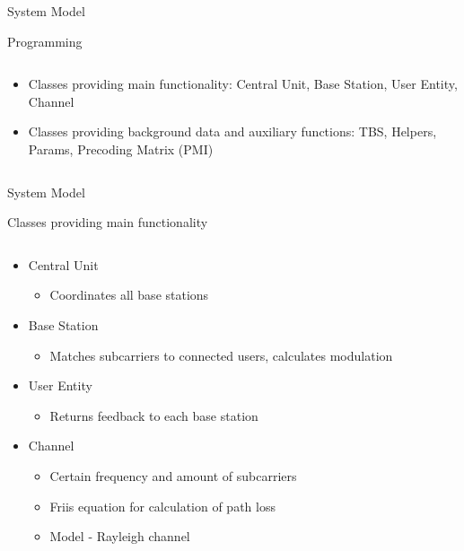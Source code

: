\documentclass[xcolor={cmyk}]{beamer}
\begin{document}
 \begin{frame}{System Model}
	 \begin{block}{Programming}
	 	\begin{columns}
			\begin{column}{.9\textwidth}
				\begin{itemize}
					\item Classes providing main functionality: Central Unit, Base Station, User Entity, Channel
					\item Classes providing background data and auxiliary functions: TBS, Helpers, Params, Precoding Matrix (PMI)
				\end{itemize}
			\end{column}
		\end{columns}
	 \end{block}
 \end{frame}
 
 
  \begin{frame}{System Model}
	 \begin{block}{Classes providing main functionality}
	 	\begin{columns}
			\begin{column}{.9\textwidth}
				\begin{itemize}
					\item Central Unit
					\begin{itemize}
						\item Coordinates all base stations 
					\end{itemize}
					\item Base Station
					\begin{itemize}
						\item Matches subcarriers to connected users, calculates modulation
					\end{itemize}
					\item User Entity
					\begin{itemize}
						\item Returns feedback to each base station
					\end{itemize}
					
					\item Channel
					\begin{itemize}
						\item Certain frequency and amount of subcarriers
						\item Friis equation for calculation of path loss
						\item Model - Rayleigh channel
					\end{itemize}
				\end{itemize}
			\end{column}
		\end{columns}
	 \end{block}
 \end{frame}
 
\end{document}
